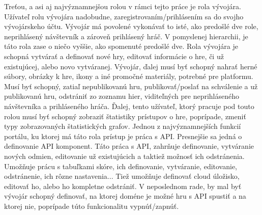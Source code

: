 Treťou, a asi aj najvýznamnejšou rolou v rámci tejto práce je rola vývojára. Užívateľ rolu vývojára nadobudne, zaregistrovaním/prihlásením sa do svojho vývojárskeho účtu. Vývojár má povolené vykonávať to isté, ako predošlé dve role, neprihlásený návštevník a zároveň prihlásený hráč. V pomyslenej hierarchii, je táto rola zase o niečo vyššie, ako spomenuté predošlé dve. Rola vývojára je schopná vytvárať a definovať nové hry, editovať informácie o hre, či už existujúcej, alebo novo vytváranej. Vývojár, ďalej musí byť schopný nahrať herné súbory, obrázky k hre, ikony a iné promočné materiály, potrebné pre platformu. Musí byť schopný, zatiaľ nepublikovanú hru, publikovať/poslať na schválenie a už publikovanú hru, odstrániť zo zoznamu hier, viditeľných pre neprihláseného návštevníka a prihláseného hráča. Ďalej, tento užívateľ, ktorý pracuje pod touto rolou musí byť schopný zobraziť štatistiky prístupov o hre, poprípade, zmeniť typy zobrazovaných štatistických grafov. Jednou z najvýznamnejších funkcií portálu, ku ktorej má táto rola prístup je práca s API. Presnejšie sa jedná o definovanie API komponent. Táto práca s API, zahrňuje definovanie, vytváranie nových odmien, editovanie už existujúcich a taktiež možnosť ich odstránenia. Umožňuje prácu s tabuľkami skóre, ich definovanie, vytváranie, editovanie, odstránenie, ich rôzne nastavenia... Tiež umožňuje definovať cloud úložisko, editovať ho, alebo ho kompletne odstrániť. V neposlednom rade, by mal byť vývojár schopný definovať, na ktorej doméne je možné hru s API spustiť a na ktorej nie, poprípade túto funkcionalitu vypnúť/zapnúť. 
